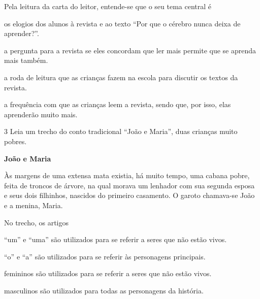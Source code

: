 Pela leitura da carta do leitor, entende-se que o seu tema central é

\begin{escolha}
\item os elogios dos alunos à revista e ao texto ``Por que o cérebro nunca 
deixa de aprender?''.

\item a pergunta para a revista se eles concordam que ler mais permite que
se aprenda mais também.

\item a roda de leitura que as crianças fazem na escola para discutir
os textos da revista.

\item a frequência com que as crianças leem a revista, sendo que, por
isso, elas aprenderão muito mais.
\end{escolha}



\num{3} Leia um trecho do conto tradicional ``João e Maria'', duas crianças muito pobres.

\begin{myquote}
\textbf{João e Maria}

Às margens de uma extensa mata existia, há muito tempo, uma cabana
pobre, feita de troncos de árvore, na qual morava um lenhador com sua
segunda esposa e seus dois filhinhos, nascidos do primeiro casamento. 
O garoto chamava-se João e a menina, Maria.

\end{myquote}

No trecho, os artigos

\begin{escolha}
\item ``um'' e ``uma'' são utilizados para se referir a seres que não estão vivos.

\item ``o'' e ``a'' são utilizados para se referir às personagens principais.

\item femininos são utilizados para se referir a seres que não estão vivos.

\item masculinos são utilizados para todas as personagens da história.
\end{escolha}

